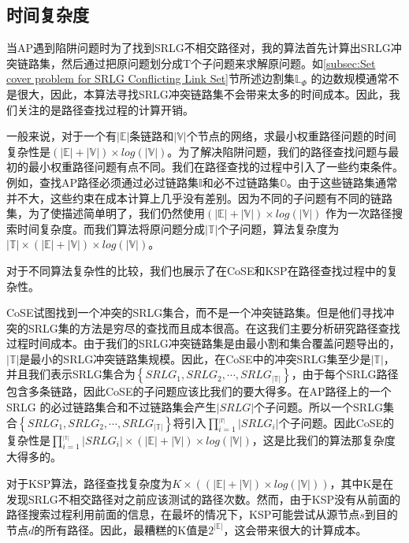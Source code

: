 

\subsection{时间复杂度}
\label{subsec:Complexity analysis}
当AP遇到陷阱问题时为了找到SRLG不相交路径对，我的算法首先计算出SRLG冲突链路集，然后通过把原问题划分成T个子问题来求解原问题。如\ref{subsec:Set cover problem for SRLG Conflicting Link Set}节所述边割集$\mathbb{L}_{\Phi}$ 的边数规模通常不是很大，因此，本算法寻找SRLG冲突链路集不会带来太多的时间成本。因此，我们关注的是路径查找过程的计算开销。

一般来说，对于一个有$|\mathbb{E}|$条链路和$|\mathbb{V}|$个节点的网络，求最小权重路径问题的时间复杂性是$(|\mathbb{E}|+|\mathbb{V}|)\times log(|\mathbb{V}|)$。为了解决陷阱问题，我们的路径查找问题与最初的最小权重路径问题有点不同。我们在路径查找的过程中引入了一些约束条件。例如，查找AP路径必须通过必过链路集$\mathbb{I}$和必不过链路集$\mathbb{O}$。由于这些链路集通常并不大，这些约束在成本计算上几乎没有差别。因为不同的子问题有不同的链路集，为了使描述简单明了，我们仍然使用$(|\mathbb{E}|+|\mathbb{V}|)\times log(|\mathbb{V}|)$ 作为一次路径搜索时间复杂度。而我们算法将原问题分成$|\mathbb{T}|$个子问题，算法复杂度为$|\mathbb{T}|\times(|\mathbb{E}|+|\mathbb{V}|)\times log(|\mathbb{V}|)$。


对于不同算法复杂性的比较，我们也展示了在CoSE\cite{rostami2007cose}和KSP\cite{eppstein1998finding}在路径查找过程中的复杂性。

CoSE试图找到一个冲突的SRLG集合，而不是一个冲突链路集。但是他们寻找冲突的SRLG集的方法是穷尽的查找而且成本很高。在这我们主要分析研究路径查找过程时间成本。由于我们的SRLG冲突链路集是由最小割和集合覆盖问题导出的，$|\mathbb{T}|$是最小的SRLG冲突链路集规模。因此，在CoSE中的冲突SRLG集至少是$|\mathbb{T}|$，并且我们表示SRLG集合为$\left\{ {SRL{G_1},SRL{G_2}, \cdots ,SRL{G_{|\mathbb{T}|}}} \right\}$，由于每个SRLG路径包含多条链路，因此CoSE的子问题应该比我们的要大得多。在AP路径上的一个SRLG 的必过链路集合和不过链路集会产生$|SRLG|$个子问题。所以一个SRLG集合$\left\{ {SRL{G_1},SRL{G_2}, \cdots ,SRL{G_{|\mathbb{T}|}}} \right\}$将引入$\prod\limits_{i = 1}^{_{\left| T \right|}} {\left| {SRL{G_i}} \right|}$个子问题。因此CoSE的复杂性是$\prod\limits_{i = 1}^{_{|\mathbb{T}|}} {\left| {SRL{G_i}} \right|}\times (|\mathbb{E}|+|\mathbb{V}|)\times log(|\mathbb{V}|)$，这是比我们的算法那复杂度大得多的。

对于KSP算法\cite{eppstein1998finding}，路径查找复杂度为$K\times ((|\mathbb{E}|+|\mathbb{V}|)\times log(|\mathbb{V}|))$，其中K是在发现SRLG不相交路径对之前应该测试的路径次数。然而，由于KSP没有从前面的路径搜索过程利用前面的信息，在最坏的情况下，KSP可能尝试从源节点$s$到目的节点$d$的所有路径。因此，最糟糕的K值是$2^{|\mathbb{E}|}$，这会带来很大的计算成本。
